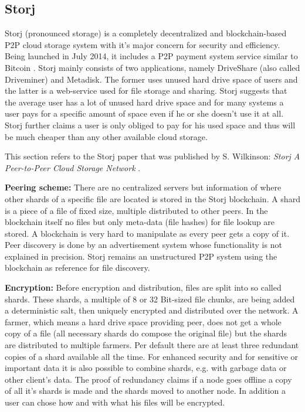 \subsection{Storj}
\label{subsec:storj}
Storj (pronounced storage) is a completely decentralized and blockchain-based P2P cloud storage system with it's major concern for security and efficiency. Being launched in July 2014, it includes a P2P payment system service similar to Bitcoin \cite{storj:blog:what_is_storj}. Storj mainly consists of two applications, namely DriveShare (also called Driveminer) and Metadisk. The former uses unused hard drive space of users and the latter is a web-service used for file storage and sharing. Storj suggests that the average user has a lot of unused hard drive space and for many systems a user pays for a specific amount of space even if he or she doesn't use it at all. Storj further claims a user is only obliged to pay for his used space and thus will be much cheaper than any other available cloud storage.

This section refers to the Storj paper that was published by S. Wilkinson: \textit{Storj A Peer-to-Peer Cloud Storage Network} \cite{storj:PDF}.

\textbf{Peering scheme:} There are no centralized servers but information of where other shards of a specific file are located is stored in the Storj blockchain. A shard is a piece of a file of fixed size, multiple distributed to other peers. In the blockchain itself no files but only meta-data (file hashes) for file lookup are stored. A blockchain is very hard to manipulate as every peer gets a copy of it. Peer discovery is done by an advertisement system whose functionality is not explained in precision. Storj remains an unstructured P2P system using the blockchain as reference for file discovery.

\textbf{Encryption:} Before encryption and distribution, files are split into so called shards. These shards, a multiple of 8 or 32 Bit-sized file chunks, are being added a deterministic salt, then uniquely encrypted and distributed over the network. A farmer, which means a hard drive space providing peer, does not get a whole copy of a file (all necessary shards do compose the original file) but the shards are distributed to multiple farmers. Per default there are at least three redundant copies of a shard available all the time. For enhanced security and for sensitive or important data it is also possible to combine shards, e.g. with garbage data or other client's data. The proof of redundancy claims if a node goes offline a copy of all it's shards is made and the shards moved to another node. In addition a user can chose how and with what his files will be encrypted.

